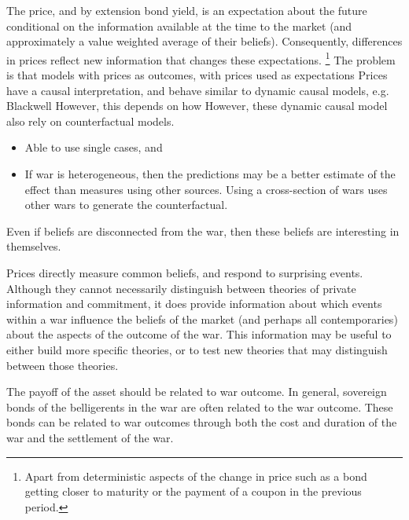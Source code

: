 The price, and by extension bond yield, is an expectation about the future conditional on the information available at the time to the market (and approximately a value weighted average of their beliefs).
Consequently, differences in prices reflect new information that changes these expectations.%
\footnote{Apart from deterministic aspects of the change in price such as a bond getting closer to maturity or the payment of a coupon in the previous period.}
The problem is that models with prices as outcomes, with prices used as expectations
Prices have a causal interpretation, and behave similar to dynamic causal models, e.g. Blackwell
However, this depends on how
However, these dynamic causal model also rely on counterfactual models.

\begin{itemize}
\item Able to use single cases, and
\item If war is heterogeneous, then the predictions may be a better estimate of the effect than measures using other sources.
  Using a cross-section of wars uses other wars to generate the counterfactual.
\end{itemize}
Even if beliefs are disconnected from the war, then these beliefs are interesting in themselves.

Prices directly measure common beliefs, and respond to surprising events.
Although they cannot necessarily distinguish between theories of private information and commitment, it does provide information about which events within a war influence the beliefs of the market (and perhaps all contemporaries) about the aspects of the outcome of the war.
This information may be useful to either build more specific theories, or to test new theories that may distinguish between those theories.

The payoff of the asset should be related to war outcome.
In general, sovereign bonds of the belligerents in the war are often related to the war outcome.
These bonds can be related to war outcomes through both the cost and duration of the war and the settlement of the war.

